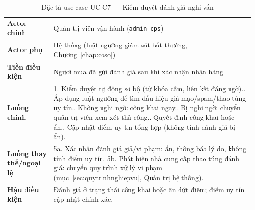 \begin{center}
\renewcommand{\arraystretch}{1.2}
\begin{longtable}{L{2.6cm} L{11.5cm}}
\caption{Đặc tả use case UC-C7 --- Kiểm duyệt đánh giá nghi vấn}
\label{tab:uc-c7} \\
\toprule
{}
 \\
\midrule
\endfirsthead
\bottomrule
\endfoot
\textbf{Actor chính} & Quản trị viên vận hành (\texttt{admin\_ops}) \\
\textbf{Actor phụ} & Hệ thống (luật ngưỡng giám sát bất thường, Chương~\ref{chap:coso}) \\
\textbf{Tiền điều kiện} & Người mua đã gửi đánh giá sau khi xác nhận nhận hàng \\
\textbf{Luồng chính} &
1. Kiểm duyệt tự động sơ bộ (từ khóa cấm, liên kết đáng ngờ).. Áp dụng luật ngưỡng để tìm dấu hiệu giả mạo/spam/thao túng uy tín.. Không nghi ngờ: công khai ngay.. Bị nghi ngờ: chuyển quản trị viên xem xét thủ công.. Quyết định công khai hoặc ẩn.. Cập nhật điểm uy tín tổng hợp (không tính đánh giá bị ẩn). \\
\textbf{Luồng thay thế/ngoại lệ} &
5a. Xác nhận đánh giá giả/vi phạm: ẩn, thông báo lý do, không tính điểm uy tín.\newline
5b. Phát hiện nhà cung cấp thao túng đánh giá: chuyển quy trình xử lý vi phạm (mục~\ref{sec:quytrinhnghiepvu}, Quản trị hệ thống). \\
\textbf{Hậu điều kiện} & Đánh giá ở trạng thái công khai hoặc ẩn dứt điểm; điểm uy tín cập nhật chính xác. \\
\end{longtable}
\end{center}

